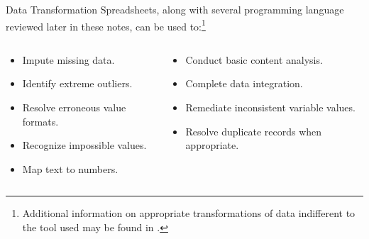 \documentclass[pdf]{beamer}
\theoremstyle{remark}
\theoremstyle{definition}
\begin{document}
\begin{frame}[t]{Data Transformation}
Spreadsheets, along with several programming language reviewed later in these notes, can be used to:\footnote{Additional information on appropriate transformations of data indifferent to the tool used may be found in \cite{burke2021}.} \\
\vspace{2.5ex}
\begin{columns}[T]
\begin{column}{0.5\textwidth}
  \begin{itemize}
    \item Impute missing data.
     \vspace{1.0ex}
    \item Identify extreme outliers.
     \vspace{1.0ex}
    \item Resolve erroneous value formats.
     \vspace{1.0ex}
    \item Recognize impossible values.
      \vspace{0.0ex}
    \item Map text to numbers. 
  \end{itemize}
\end{column}
\begin{column}{0.5\textwidth}  %
  \begin{itemize}
    \item Conduct basic content analysis.
     \vspace{1.0ex}
    \item Complete data integration.
     \vspace{1.0ex}
    \item Remediate inconsistent variable values.
     \vspace{1.0ex}
    \item Resolve duplicate records when appropriate.
  \end{itemize}  
\end{column}
\end{columns}
\end{frame}
\end{document}
